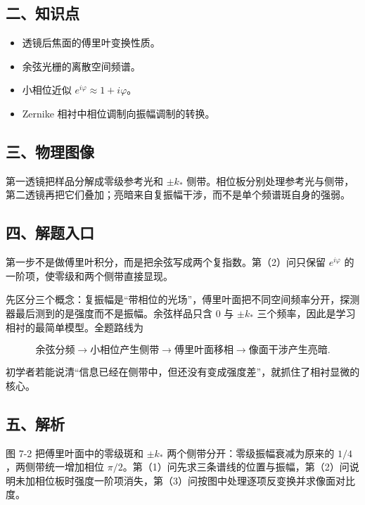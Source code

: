 \documentclass[12pt,a4paper,UTF8]{ctexart}
\newcommand{\tightlist}{\setlength{\itemsep}{0pt}\setlength{\parskip}{0pt}}
\begin{document}
\subsection{二、知识点}\label{ux4e8cux77e5ux8bc6ux70b9-6}

\begin{itemize}
\tightlist
\item
  透镜后焦面的傅里叶变换性质。
\item
  余弦光栅的离散空间频谱。
\item
  小相位近似 \(e^{i\varphi}\approx1+i\varphi\)。
\item
  Zernike 相衬中相位调制向振幅调制的转换。
\end{itemize}

\subsection{三、物理图像}\label{ux4e09ux7269ux7406ux56feux50cf-6}

第一透镜把样品分解成零级参考光和 \(\pm k_*\)
侧带。相位板分别处理参考光与侧带，第二透镜再把它们叠加；亮暗来自复振幅干涉，而不是单个频谱斑自身的强弱。

\subsection{四、解题入口}\label{ux56dbux89e3ux9898ux5165ux53e3-6}

第一步不是做傅里叶积分，而是把余弦写成两个复指数。第（2）问只保留
\(e^{i\varphi}\) 的一阶项，使零级和两个侧带直接显现。

先区分三个概念：复振幅是``带相位的光场''，傅里叶面把不同空间频率分开，探测器最后测到的是强度而不是振幅。余弦样品只含
\(0\) 与 \(\pm k_*\) 三个频率，因此是学习相衬的最简单模型。全题路线为

\[\text{余弦分频}\to\text{小相位产生侧带}\to
\text{傅里叶面移相}\to\text{像面干涉产生亮暗}.\]

初学者若能说清``信息已经在侧带中，但还没有变成强度差''，就抓住了相衬显微的核心。

\subsection{五、解析}\label{ux4e94ux89e3ux6790-6}

图 7-2 把傅里叶面中的零级斑和 \(\pm k_*\)
两个侧带分开：零级振幅衰减为原来的 \(1/4\)，两侧带统一增加相位
\(\pi/2\)。第（1）问先求三条谱线的位置与振幅，第（2）问说明未加相位板时强度一阶项消失，第（3）问按图中处理逐项反变换并求像面对比度。
\end{document}
